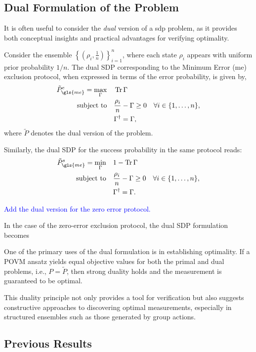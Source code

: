 \documentclass[12pt,letterpaper]{article}
\DeclareMathOperator{\tr}{Tr}
\begin{document}
\begin{multicols}{2}
\subsection{Dual Formulation of the Problem}

It is often useful to consider the \emph{dual} version of a \gls{sdp} problem, as it provides both conceptual insights and practical advantages for verifying optimality. 

Consider the ensemble $\left\{ \left( \rho_i, \frac{1}{n} \right) \right\}_{i=1}^n$, where each state $\rho_i$ appears with uniform prior probability $1/n$. The dual SDP corresponding to the Minimum Error (\gls{me}) exclusion protocol, when expressed in terms of the error probability, is given by,
\begin{align*}
	\tilde{P}_{\gls{me}}^e = \max_{\Gamma} \quad & \tr{\Gamma} \\
	\text{subject to} \quad & \frac{\rho_i}{n} - \Gamma \geq 0 \quad \forall i \in \{1, \dots, n\}, \\
	& \Gamma^\dagger = \Gamma,
\end{align*}
where $\tilde{P}$ denotes the dual version of the problem.

Similarly, the dual SDP for the success probability in the same protocol reads:
\begin{align*}
	\tilde{P}_{\gls{me}}^s = \min_{\Gamma} \quad & 1 - \tr{\Gamma} \\
	\text{subject to} \quad & \frac{\rho_i}{n} - \Gamma \geq 0 \quad \forall i \in \{1, \dots, n\}, \\
	& \Gamma^\dagger = \Gamma.
\end{align*}

\textcolor{blue}{Add the dual version for the zero error protocol.}

In the case of the zero-error exclusion protocol, the dual SDP formulation becomes 

One of the primary uses of the dual formulation is in establishing optimality. If a POVM ansatz yields equal objective values for both the primal and dual problems, i.e., $P = \tilde{P}$, then strong duality holds and the measurement is guaranteed to be optimal.

This duality principle not only provides a tool for verification but also suggests constructive approaches to discovering optimal measurements, especially in structured ensembles such as those generated by group actions.
\subsection{Previous Results}\label{sectionPreviousResults}


\end{multicols}
\end{document}
